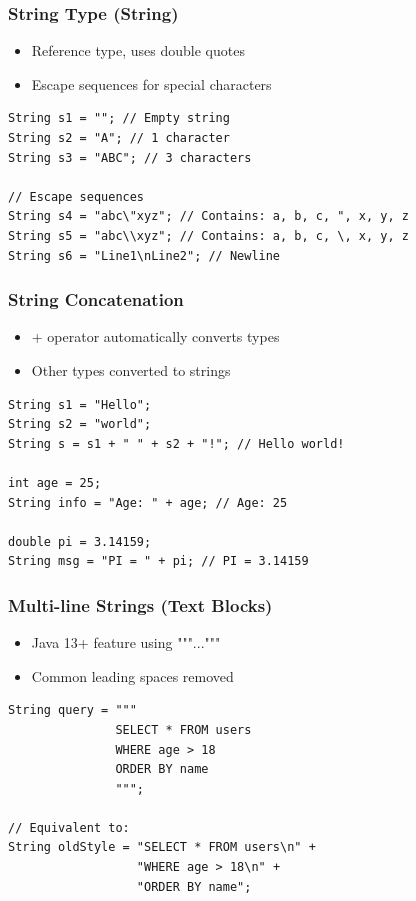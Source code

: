 \documentclass[serif, aspectratio=169]{beamer}
\begin{document}
\begin{frame}[fragile]
\frametitle{String Type (String)}
\begin{itemize}
    \item Reference type, uses double quotes
    \item Escape sequences for special characters
\end{itemize}
\begin{lstlisting}
String s1 = ""; // Empty string
String s2 = "A"; // 1 character
String s3 = "ABC"; // 3 characters

// Escape sequences
String s4 = "abc\"xyz"; // Contains: a, b, c, ", x, y, z
String s5 = "abc\\xyz"; // Contains: a, b, c, \, x, y, z
String s6 = "Line1\nLine2"; // Newline
\end{lstlisting}
\end{frame}

\begin{frame}[fragile]
\frametitle{String Concatenation}
\begin{itemize}
    \item + operator automatically converts types
    \item Other types converted to strings
\end{itemize}
\begin{lstlisting}
String s1 = "Hello";
String s2 = "world";
String s = s1 + " " + s2 + "!"; // Hello world!

int age = 25;
String info = "Age: " + age; // Age: 25

double pi = 3.14159;
String msg = "PI = " + pi; // PI = 3.14159
\end{lstlisting}
\end{frame}

\begin{frame}[fragile]
\frametitle{Multi-line Strings (Text Blocks)}
\begin{itemize}
    \item Java 13+ feature using """..."""
    \item Common leading spaces removed
\end{itemize}
\begin{lstlisting}
String query = """
               SELECT * FROM users
               WHERE age > 18
               ORDER BY name
               """;

// Equivalent to:
String oldStyle = "SELECT * FROM users\n" +
                  "WHERE age > 18\n" +
                  "ORDER BY name";
\end{lstlisting}
\end{frame}
\end{document}
